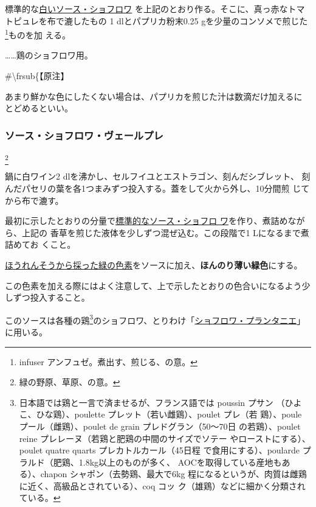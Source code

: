 \begin{recette}
標準的な\protect\hyperlink{sauce-chaud-froid-blanche-ordinaire}{白いソース・ショフロワ}
を上記のとおり作る。そこに、真っ赤なトマトピュレを布で漉したもの
1\undemi{} dlとパプリカ粉末0.25 gを少量のコンソメで煎じた\footnote{infuser
  アンフュゼ。煮出す、煎じる、の意。}ものを加 える。

\ldots{}\ldots{}鶏のショフロワ用。

\#\textbackslash{}frsub\{【原注】

あまり鮮かな色にしたくない場合は、パプリカを煎じた汁は数滴だけ加えるに
とどめるといい。

\maeaki

\hypertarget{sauce-choud-froid-vert-pre}{%
\subsubsection{ソース・ショフロワ・ヴェールプレ}\label{sauce-choud-froid-vert-pre}}

\footnote{緑の野原、草原、の意。}


鍋に白ワイン2 dlを沸かし、セルフイユとエストラゴン、刻んだシブレット、
刻んだパセリの葉を各1つまみずつ投入する。蓋をして火から外し、10分間煎
じてから布で漉す。

最初に示したとおりの分量で\protect\hyperlink{sauce-chaud-froid-blanche-ordinaire}{標準的なソース・ショフロ
ワ}を作り、煮詰めながら、上記の
香草を煎じた液体を少しずつ混ぜ込む。この段階で1 Lになるまで煮詰めてお
くこと。

\protect\hyperlink{}{ほうれんそうから採った緑の色素}をソースに加え、\textbf{ほんのり薄い緑色}にする。

この色素を加える際にはよく注意して、上で示したとおりの色合いになるよう少しずつ投入すること。

このソースは各種の鶏\footnote{日本語では鶏と一言で済ませるが、フランス語では
  poussin プサン （ひよこ、ひな鶏）、poulette
  プレット（若い雌鶏）、poulet プレ（若 鶏）、poule
  プール（雌鶏）、poulet de grain プレドグラン（50〜70日
  の若鶏）、poulet reine プレレーヌ（若鶏と肥鶏の中間のサイズでソテー
  やローストにする）、poulet quatre quarts プレカトルカール（45日程
  で食用にする）、poularde プラルド（肥鶏、1.8kg以上のものが多く、
  AOCを取得している産地もある）、chapon シャポン（去勢鶏、最大で6kg
  程になるというが、肉質は雌鶏に近く、高級品とされている）、coq コッ
  ク（雄鶏）などに細かく分類されている。}のショフロワ、とりわけ「\protect\hyperlink{}{ショフロワ・プランタニエ}」に用いる。


\end{recette}
